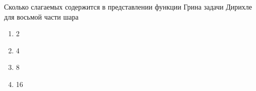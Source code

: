 Сколько слагаемых содержится в представлении функции Грина задачи Дирихле для восьмой части шара

\begin{enumerate}[label=\arabic*)]
    \item 2
    \item 4
    \item 8
    \item 16
\end{enumerate}

